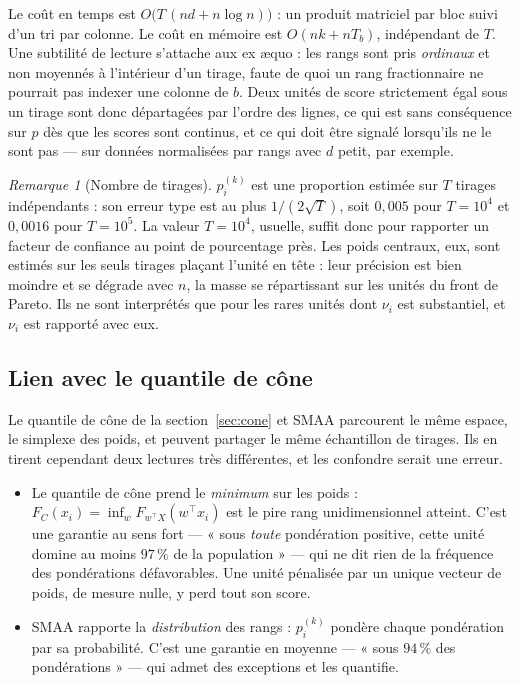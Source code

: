 \documentclass[11pt,a4paper]{article}
\theoremstyle{definition}
\theoremstyle{remark}
\newtheorem{remarque}{Remarque}[section]
\begin{document}
\bigskip

Le coût en temps est $O\big(T\,(nd + n\log n)\big)$ : un produit matriciel par bloc suivi
d'un tri par colonne. Le coût en mémoire est $O(nk + nT_b)$, indépendant de $T$. Une
subtilité de lecture s'attache aux ex \ae quo : les rangs sont pris \emph{ordinaux} et
non moyennés à l'intérieur d'un tirage, faute de quoi un rang fractionnaire ne pourrait
pas indexer une colonne de $b$. Deux unités de score strictement égal sous un tirage sont
donc départagées par l'ordre des lignes, ce qui est sans conséquence sur $p$ dès que les
scores sont continus, et ce qui doit être signalé lorsqu'ils ne le sont pas --- sur
données normalisées par rangs avec $d$ petit, par exemple.

\medskip

\begin{remarque}[Nombre de tirages]
  \label{rem:smaa-tirages}
  $p^{(k)}_i$ est une proportion estimée sur $T$ tirages indépendants : son erreur type
  est au plus $1/(2\sqrt{T})$, soit $0{,}005$ pour $T = 10^4$ et $0{,}0016$ pour
  $T = 10^5$. La valeur $T = 10^4$, usuelle, suffit donc pour rapporter un facteur de
  confiance au point de pourcentage près. Les poids centraux, eux, sont estimés sur les
  seuls tirages plaçant l'unité en tête : leur précision est bien moindre et se dégrade
  avec $n$, la masse se répartissant sur les unités du front de Pareto. Ils ne sont
  interprétés que pour les rares unités dont $\nu_i$ est substantiel, et $\nu_i$ est
  rapporté avec eux.
\end{remarque}

\bigskip

\subsection{Lien avec le quantile de cône}
\label{sec:smaa-cone}

\medskip

Le quantile de cône de la section~\ref{sec:cone} et SMAA parcourent le même espace, le
simplexe des poids, et peuvent partager le même échantillon de tirages. Ils en tirent
cependant deux lectures très différentes, et les confondre serait une erreur.

\medskip

\begin{itemize}[nosep,leftmargin=1.4em]
  \item Le quantile de cône prend le \emph{minimum} sur les poids : $F_C(x_i) =
  \inf_{w} F_{w^\top X}(w^\top x_i)$ est le pire rang unidimensionnel atteint. C'est une
  garantie au sens fort --- « sous \emph{toute} pondération positive, cette unité domine
  au moins $97\,\%$ de la population » --- qui ne dit rien de la fréquence des
  pondérations défavorables. Une unité pénalisée par un unique vecteur de poids, de mesure
  nulle, y perd tout son score.
  \item SMAA rapporte la \emph{distribution} des rangs : $p^{(k)}_i$ pondère chaque
  pondération par sa probabilité. C'est une garantie en moyenne --- « sous $94\,\%$ des
  pondérations » --- qui admet des exceptions et les quantifie.
\end{itemize}
\end{document}
